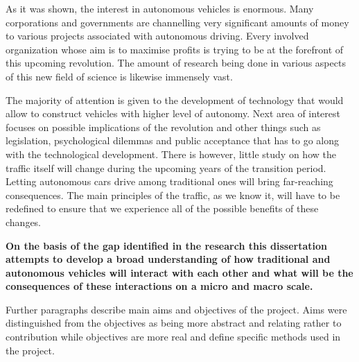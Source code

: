 \documentclass[11pt,english]{article}
\begin{document}
\par



As it was shown, the interest in autonomous vehicles is enormous. Many corporations and governments are channelling very significant amounts of money to various projects associated with autonomous driving. Every involved organization whose aim is to maximise profits is trying to be at the forefront of this upcoming revolution. The amount of research being done in various aspects of this new field of science is likewise immensely vast. 
\par
The majority of attention is given to the development of technology that would allow to construct vehicles with higher level of autonomy. Next area of interest focuses on possible implications of the revolution and other things such as legislation, psychological dilemmas and public acceptance that has to go along with the technological development. There is however, little study on how the traffic itself will change during the upcoming years of the transition period. Letting autonomous cars drive among traditional ones will bring far-reaching consequences. The main principles of the traffic, as we know it, will have to be redefined to ensure that we experience all of the possible benefits of these changes. 
\par
\textbf{On the basis of the gap identified in the research this dissertation attempts to develop a broad understanding of how traditional and autonomous vehicles will interact with each other and what will be the consequences of these interactions on a micro and macro scale.}





\par 
Further paragraphs describe main aims and objectives of the project. Aims were distinguished from the objectives as being more abstract and relating rather to contribution while objectives are more real and define specific methods used in the project.



\end{document}
